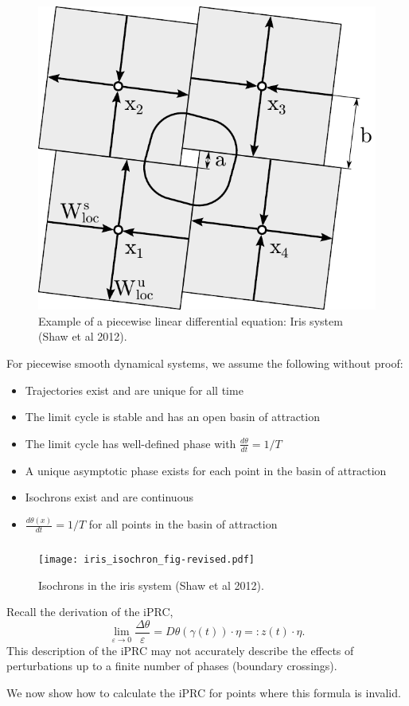 \documentclass{beamer}
\begin{document}
\begin{frame}
 \begin{figure}
 \frametitle{\insertsection}
  \framesubtitle{\insertsubsection}
  \includegraphics[width=.5\textwidth]{sine_to_iris_fig_sketch_iris.pdf}
  \caption{Example of a piecewise linear differential equation: Iris system (Shaw et al 2012).}
 \end{figure}
\end{frame}


\begin{frame}
  For piecewise smooth dynamical systems, we assume the following without proof:
  \begin{itemize}
   \item Trajectories exist and are unique for all time
   \item The limit cycle is stable and has an open basin of attraction
   \item The limit cycle has well-defined phase with $\frac{d\theta}{dt} = 1/T$
   \item A unique asymptotic phase exists for each point in the basin of attraction
   \item Isochrons exist and are continuous
   \item $\frac{d\theta(x)}{dt} = 1/T$ for all points in the basin of attraction
  \end{itemize}
\end{frame}

\begin{frame}
 \begin{figure}
 \frametitle{\insertsection}
  \framesubtitle{\insertsubsection}
  \texttt{[image: iris\_isochron\_fig-revised.pdf]}
  \caption{Isochrons in the iris system (Shaw et al 2012).}
 \end{figure}
\end{frame}


\begin{frame}
Recall the derivation of the iPRC,
\begin{equation}
\lim_{\varepsilon \rightarrow 0} \frac{\Delta \theta}{\varepsilon} = D\theta(\gamma(t))\cdot \eta =: z(t) \cdot \eta.
\end{equation}
This description of the iPRC may not accurately describe the effects of perturbations up to a finite number of phases (boundary crossings).

We now show how to calculate the iPRC for points where this formula is invalid.
  \end{frame}
\end{document}
